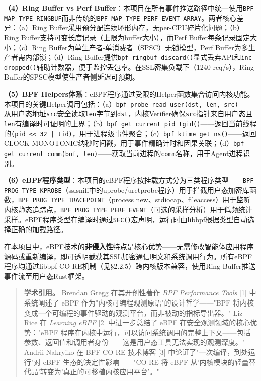 \documentclass[a4paper]{ctexart}
\makeatletter
\renewcommand{\_}{%
  \ifmmode
    \nfss@text{\textunderscore}%
  \else
    \textunderscore\discretionary{}{}{}%
  \fi}
\makeatother
\begin{document}
\textbf{（4）Ring Buffer vs Perf Buffer}：本项目在所有事件推送路径中统一使用\texttt{BPF\_MAP\_TYPE\_RINGBUF}而非传统的\texttt{BPF\_MAP\_TYPE\_PERF\_EVENT\_ARRAY}。两者核心差异：（a）Ring Buffer采用预分配连续环形内存，无per-CPU碎片化问题；（b）Ring Buffer支持可变长度记录（上限为buffer大小），而Perf Buffer每条记录固定大小；（c）Ring Buffer为单生产者-单消费者（SPSC）无锁模型，Perf Buffer为多生产者需内部锁；（d）Ring Buffer提供\texttt{bpf\_ringbuf\_discard()}显式丢弃API和\texttt{inc\_dropped()}辅助计数器，便于监控丢包率。在SSL密集负载下（1240 req/s），Ring Buffer的SPSC模型使生产者侧延迟可预期。


\textbf{（5）BPF Helpers体系}：eBPF程序通过受限的Helper函数集合访问内核功能。本项目的关键Helper调用包括：（a）\texttt{bpf\_probe\_read\_user(dst, len, src)}——从用户态地址\texttt{src}安全读取\texttt{len}字节到\texttt{dst}，内核Verifier确保\texttt{src}指针来自用户态且\texttt{len}有编译时可证明的上界；（b）\texttt{bpf\_get\_current\_pid\_tgid()}——返回当前线程的\texttt{(pid << 32 | tid)}，用于进程级事件聚合；（c）\texttt{bpf\_ktime\_get\_ns()}——返回CLOCK\_MONOTONIC纳秒时间戳，用于事件精确计时和因果关联；（d）\texttt{bpf\_get\_current\_comm(buf, len)}——获取当前进程的\texttt{comm}名称，用于Agent进程识别。


\textbf{（6）eBPF程序类型}：本项目的eBPF程序按挂载方式分为三类程序类型——\texttt{BPF\_PROG\_TYPE\_KPROBE}（sslsniff中的uprobe/uretprobe程序）用于拦截用户态加密库函数，\texttt{BPF\_PROG\_TYPE\_TRACEPOINT}（process\_new、stdiocap、fileaccess）用于监听内核静态追踪点，\texttt{BPF\_PROG\_TYPE\_PERF\_EVENT}（可选的采样分析）用于低频统计采样。eBPF程序类型在编译时通过\texttt{SEC()}宏声明，运行时由libbpf根据类型自动选择正确的加载路径。


在本项目中，eBPF技术的\textbf{非侵入性}特点是核心优势——无需修改智能体应用程序源码或重新编译，即可透明截获其SSL加密通信明文和系统调用行为。所有eBPF程序均通过libbpf CO-RE机制（见§2.2.5）跨内核版本兼容，使用Ring Buffer推送事件流至用户态Rust框架。


\begin{quote}
\textbf{学术引用。} Brendan Gregg 在其开创性著作 \textit{BPF Performance Tools} [1] 中系统阐述了 eBPF 作为"内核可编程观测原语"的设计哲学——"BPF 将内核变成一个可编程的事件驱动的观测平台，而非被动的指标导出器。" Liz Rice 在 \textit{Learning eBPF} [2] 中进一步总结了 eBPF 在安全观测领域的核心优势："eBPF 程序在内核中运行，可以访问系统调用的完整上下文——包括参数、返回值和调用者身份——这是用户态工具无法实现的观测深度。" Andrii Nakryiko 在 BPF CO-RE 技术博客 [3] 中论证了"一次编译，到处运行"对 eBPF 生态的决定性影响——"CO-RE 将 eBPF 从'内核模块的轻量替代品'转变为'真正的可移植内核应用平台'。"

\end{quote}
\end{document}
